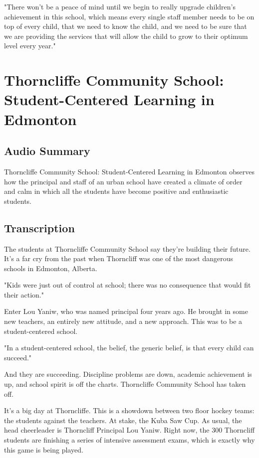 "There won't be a peace of mind until we begin to really upgrade children's achievement in this school, which means every single staff member needs to be on top of every child, that we need to know the child, and we need to be sure that we are providing the services that will allow the child to grow to their optimum level every year."

\section{Thorncliffe Community School: Student-Centered Learning in Edmonton}

\subsection{Audio Summary}

Thorncliffe Community School: Student-Centered Learning in Edmonton observes how the principal and staff of an urban school have created a climate of order and calm in which all the students have become positive and enthusiastic students.

\subsection{Transcription}

The students at Thorncliffe Community School say they're building their future. It's a far cry from the past when Thorncliff was one of the most dangerous schools in Edmonton, Alberta.

"Kids were just out of control at school; there was no consequence that would fit their action."

Enter Lou Yaniw, who was named principal four years ago. He brought in some new teachers, an entirely new attitude, and a new approach. This was to be a student-centered school.

"In a student-centered school, the belief, the generic belief, is that every child can succeed."

And they are succeeding. Discipline problems are down, academic achievement is up, and school spirit is off the charts. Thorncliffe Community School has taken off.

It's a big day at Thorncliffe. This is a showdown between two floor hockey teams: the students against the teachers. At stake, the Kuba Saw Cup. As usual, the head cheerleader is Thorncliff Principal Lou Yaniw. Right now, the 300 Thorncliff students are finishing a series of intensive assessment exams, which is exactly why this game is being played.

